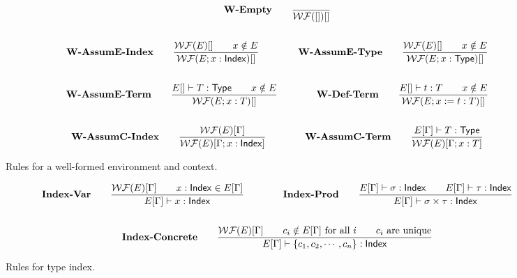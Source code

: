 \documentclass{article}
\begin{document}
\begin{figure}[h]
    \begin{gather*}
        \textbf{W-Empty} \qquad
        \frac{}{\mathcal{WF}([])[]} \\
        \\
        \textbf{W-AssumE-Index} \qquad
        \frac{\mathcal{WF}(E)[] \qquad x \notin E}{\mathcal{WF}(E; x : \mathsf{Index})[]}\qquad \qquad
        \textbf{W-AssumE-Type} \qquad
        \frac{\mathcal{WF}(E)[] \qquad x \notin E}{\mathcal{WF}(E; x : \mathsf{Type})[]} \\
        \\
        \textbf{W-AssumE-Term} \qquad
        \frac{E[] \vdash T : \mathsf{Type} \qquad x \notin E}{\mathcal{WF}(E; x:T)[]}
        \qquad \qquad
        \textbf{W-Def-Term} \qquad
        \frac{E[]\vdash t:T \qquad x \notin E}{\mathcal{WF}(E; x:=t:T)[]} \\
        \\
        \textbf{W-AssumC-Index} \qquad
        \frac{\mathcal{WF}(E)[\Gamma]}{\mathcal{WF}(E)[\Gamma; x : \mathsf{Index}]}
        \qquad \qquad
        \textbf{W-AssumC-Term} \qquad
        \frac{E[\Gamma] \vdash T : \mathsf{Type}}{\mathcal{WF}(E)[\Gamma; x : T]}
    \end{gather*}
    \caption{Rules for a well-formed environment and context.}
\end{figure}

\begin{figure}
    \begin{gather*}
        \textbf{Index-Var} \qquad
        \frac{\mathcal{WF}(E)[\Gamma] \qquad x : \mathsf{Index} \in E[\Gamma]}{E[\Gamma] \vdash x : \mathsf{Index}}
        \qquad \qquad
        \textbf{Index-Prod} \qquad
        \frac{E[\Gamma] \vdash \sigma : \mathsf{Index} \qquad E[\Gamma] \vdash \tau : \mathsf{Index}}{E[\Gamma] \vdash \sigma \times \tau : \mathsf{Index}} \\
        \\
        \textbf{Index-Concrete} \qquad
        \frac{\mathcal{WF}(E)[\Gamma] \qquad c_i \notin E[\Gamma] \text{ for all } i \qquad c_i \text{ are unique}}{E[\Gamma] \vdash \{c_1, c_2, \cdots, c_n\} : \mathsf{Index}}
    \end{gather*}
    \caption{Rules for type index.}
\end{figure}
\end{document}
